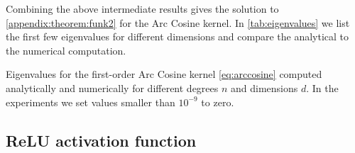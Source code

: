 Combining the above intermediate results gives the solution to \cref{appendix:theorem:funk2} for the Arc Cosine kernel. In \cref{tab:eigenvalues} we list the first few eigenvalues for different dimensions and compare the analytical to the numerical computation. 

\begin{table}[tbh]
    \centering
    \caption{Eigenvalues for the first-order Arc Cosine kernel \cref{eq:arccosine}  computed analytically and numerically for different degrees $n$ and dimensions $d$. In the experiments we set values smaller than $10^{-9}$ to zero. \label{tab:eigenvalues}}
    \vspace{.2cm}
    
\end{table}


\subsection{ReLU activation function}

